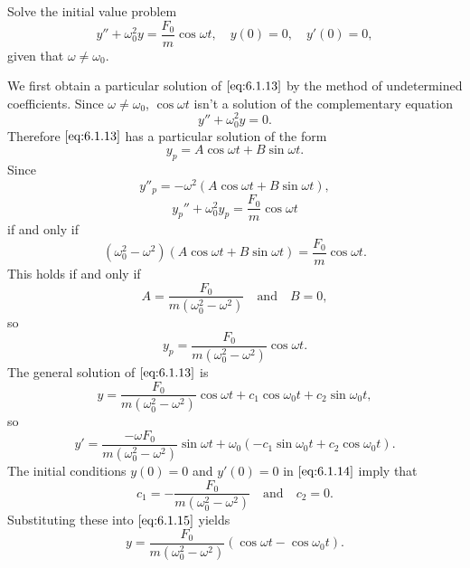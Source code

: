 \documentclass{ximera}
\begin{document}
\begin{example}\label{example:6.1.4}
 Solve the initial value problem
\begin{equation}\label{eq:6.1.14}
y''+\omega_0^2y=\frac{F_0}{m}\cos\omega t, \quad  y(0)=0,\quad y'(0)=0,
\end{equation}
 given that $\omega\neq\omega_0$.
 
\begin{explanation}
We first obtain a particular solution of $\eqref{eq:6.1.13}$ by the method
of undetermined coefficients. Since $\omega\ne\omega _0$,
 $\cos\omega t$ isn't  a solution of the complementary equation
$$
y''+\omega_0^2y=0.
$$
Therefore $\eqref{eq:6.1.13}$ has a particular solution of the form
$$
y_p=A\cos\omega t+B\sin\omega t.
$$
Since
$$
y''_p=-\omega^2(A\cos\omega t+B\sin\omega t),
$$
$$
y_p''+\omega_0^2y_p=\frac{F_0}{m}\cos\omega t
$$
if and only if
$$
(\omega_0^2-\omega^2)\left(A\cos\omega t+
B\sin\omega t\right)=\frac{F_0}{m}\cos\omega t.
$$
 This holds if and only if
$$
A=\frac{F_0}{m(\omega_0^2-\omega^2)}\quad\mbox{and}\quad B=0,
$$
so
$$
y_p=\frac{F_0}{m(\omega_0^2-\omega^2)}\cos\omega t.
$$
The general solution of $\eqref{eq:6.1.13}$  is
\begin{equation}\label{eq:6.1.15}
y=\frac{F_0}{m(\omega_0^2-\omega^2)}\cos\omega t
+c_1\cos\omega_0 t+c_2\sin\omega_0t,
\end{equation}
so
$$
y'=\frac{-\omega F_0}{m(\omega_0^2-\omega^2)}\sin\omega t
+\omega_0(-c_1\sin\omega_0 t+c_2\cos\omega_0t).
$$
The initial conditions $y(0)=0$ and $y'(0)=0$ in $\eqref{eq:6.1.14}$ imply
that
$$
c_1=-\frac{F_0}{m(\omega_0^2-\omega^2)}\quad\mbox{and}\quad
c_2=0.
$$
Substituting these into $\eqref{eq:6.1.15}$ yields
\begin{equation}\label{eq:6.1.16}
y=\frac{F_0}{m(\omega_0^2-\omega^2)}(\cos\omega t-\cos\omega
_0t).
\end{equation}
 

\end{explanation}
\end{example}
\end{document}
